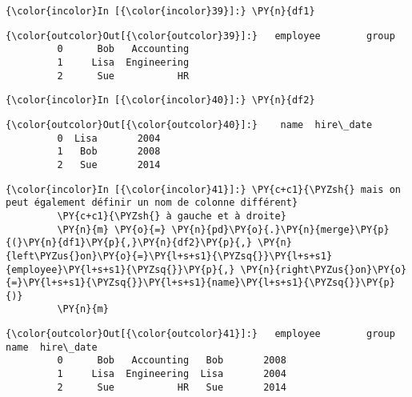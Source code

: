     \begin{Verbatim}[commandchars=\\\{\},frame=single,framerule=0.3mm,rulecolor=\color{cellframecolor}]
{\color{incolor}In [{\color{incolor}39}]:} \PY{n}{df1}
\end{Verbatim}


\begin{Verbatim}[commandchars=\\\{\},frame=single,framerule=0.3mm,rulecolor=\color{cellframecolor}]
{\color{outcolor}Out[{\color{outcolor}39}]:}   employee        group
         0      Bob   Accounting
         1     Lisa  Engineering
         2      Sue           HR
\end{Verbatim}
            
    \begin{Verbatim}[commandchars=\\\{\},frame=single,framerule=0.3mm,rulecolor=\color{cellframecolor}]
{\color{incolor}In [{\color{incolor}40}]:} \PY{n}{df2}
\end{Verbatim}


\begin{Verbatim}[commandchars=\\\{\},frame=single,framerule=0.3mm,rulecolor=\color{cellframecolor}]
{\color{outcolor}Out[{\color{outcolor}40}]:}    name  hire\_date
         0  Lisa       2004
         1   Bob       2008
         2   Sue       2014
\end{Verbatim}
            
    \begin{Verbatim}[commandchars=\\\{\},frame=single,framerule=0.3mm,rulecolor=\color{cellframecolor}]
{\color{incolor}In [{\color{incolor}41}]:} \PY{c+c1}{\PYZsh{} mais on peut également définir un nom de colonne différent}
         \PY{c+c1}{\PYZsh{} à gauche et à droite}
         \PY{n}{m} \PY{o}{=} \PY{n}{pd}\PY{o}{.}\PY{n}{merge}\PY{p}{(}\PY{n}{df1}\PY{p}{,}\PY{n}{df2}\PY{p}{,} \PY{n}{left\PYZus{}on}\PY{o}{=}\PY{l+s+s1}{\PYZsq{}}\PY{l+s+s1}{employee}\PY{l+s+s1}{\PYZsq{}}\PY{p}{,} \PY{n}{right\PYZus{}on}\PY{o}{=}\PY{l+s+s1}{\PYZsq{}}\PY{l+s+s1}{name}\PY{l+s+s1}{\PYZsq{}}\PY{p}{)}
         \PY{n}{m}
\end{Verbatim}


\begin{Verbatim}[commandchars=\\\{\},frame=single,framerule=0.3mm,rulecolor=\color{cellframecolor}]
{\color{outcolor}Out[{\color{outcolor}41}]:}   employee        group  name  hire\_date
         0      Bob   Accounting   Bob       2008
         1     Lisa  Engineering  Lisa       2004
         2      Sue           HR   Sue       2014
\end{Verbatim}
            
